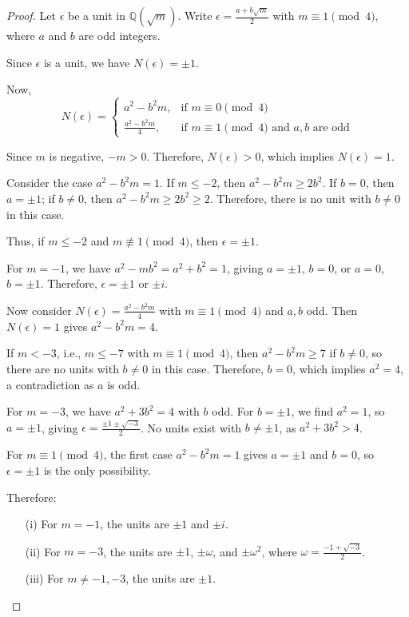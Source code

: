 \documentclass{article}
\begin{document}
\begin{proof}
    Let \( \epsilon \) be a unit in \( \mathbb{Q}(\sqrt{m}) \). Write \( \epsilon = \frac{a + b\sqrt{m}}{2} \) with \( m \equiv 1 \pmod{4} \), where \( a \) and \( b \) are odd integers.

    Since \( \epsilon \) is a unit, we have \( N(\epsilon) = \pm 1 \).

    Now,
    \[
    N(\epsilon) = 
    \begin{cases}
    a^2 - b^2 m, & \text{if } m \equiv 0 \pmod{4} \\
    \frac{a^2 - b^2 m}{4}, & \text{if } m \equiv 1 \pmod{4} \text{ and } a, b \text{ are odd}
    \end{cases}
    \]
    
    Since \( m \) is negative, \( -m > 0 \). Therefore, \( N(\epsilon) > 0 \), which implies \( N(\epsilon) = 1 \).

    Consider the case \( a^2 - b^2 m = 1 \). If \( m \leq -2 \), then \( a^2 - b^2 m \geq 2b^2 \). If \( b = 0 \), then \( a = \pm 1 \); if \( b \neq 0 \), then \( a^2 - b^2 m \geq 2b^2 \geq 2 \). Therefore, there is no unit with \( b \neq 0 \) in this case.

    Thus, if \( m \leq -2 \) and \( m \not\equiv 1 \pmod{4} \), then \( \epsilon = \pm 1 \).

    For \( m = -1 \), we have \( a^2 - mb^2 = a^2 + b^2 = 1 \), giving \( a = \pm 1 \), \( b = 0 \), or \( a = 0 \), \( b = \pm 1 \). Therefore, \( \epsilon = \pm 1 \) or \( \pm i \).

    Now consider \( N(\epsilon) = \frac{a^2 - b^2 m}{4} \) with \( m \equiv 1 \pmod{4} \) and \( a, b \) odd. Then \( N(\epsilon) = 1 \) gives \( a^2 - b^2 m = 4 \).

    If \( m < -3 \), i.e., \( m \leq -7 \) with \( m \equiv 1 \pmod{4} \), then \( a^2 - b^2 m \geq 7 \) if \( b \neq 0 \), so there are no units with \( b \neq 0 \) in this case. Therefore, \( b = 0 \), which implies \( a^2 = 4 \), a contradiction as \( a \) is odd. 

    For \( m = -3 \), we have \( a^2 + 3b^2 = 4 \) with \( b \) odd. For \( b = \pm 1 \), we find \( a^2 = 1 \), so \( a = \pm 1 \), giving \( \epsilon = \frac{\pm 1 \pm \sqrt{-3}}{2} \). No units exist with \( b \neq \pm 1 \), as \( a^2 + 3b^2 > 4 \).

    For \( m \equiv 1 \pmod{4} \), the first case \( a^2 - b^2 m = 1 \) gives \( a = \pm 1 \) and \( b = 0 \), so \( \epsilon = \pm 1 \) is the only possibility.

    Therefore:
    \begin{itemize}
        \item[(i)] For \( m = -1 \), the units are \( \pm 1 \) and \( \pm i \).
        \item[(ii)] For \( m = -3 \), the units are \( \pm 1 \), \( \pm \omega \), and \( \pm \omega^2 \), where \( \omega = \frac{-1 + \sqrt{-3}}{2} \).
        \item[(iii)] For \( m \neq -1, -3 \), the units are \( \pm 1 \).
    \end{itemize}
\end{proof}
\end{document}
